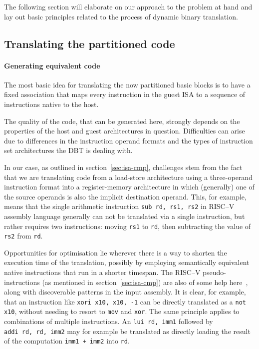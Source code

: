 The following section will elaborate on our approach to the problem at hand and lay out basic principles related to the process of dynamic binary translation.

\subsection{Translating the partitioned code}
\paragraph{Generating equivalent code} \mbox{}

The most basic idea for translating the now partitioned basic blocks is to have a fixed association that maps every instruction in the guest ISA to a sequence of instructions native to the host.

The quality of the code, that can be generated here, strongly depends on the properties of the host and guest architectures in question.
Difficulties can arise due to differences in the instruction operand formats and the types of instruction set architectures the DBT is dealing with.

In our case, as outlined in section~\ref{sec:isa-cmp}, challenges stem from the fact that we are translating code from a load-store architecture using a three-operand instruction format into a register-memory architecture in which (generally) one of the source operands is also the implicit destination operand.
This, for example, means that the single arithmetic instruction \texttt{sub~rd,~rs1,~rs2} in RISC--V assembly language generally can not be translated via a single instruction, but rather requires two instructions: moving \texttt{rs1} to \texttt{rd}, then subtracting the value of \texttt{rs2} from \texttt{rd}.

Opportunities for optimisation lie wherever there is a way to shorten the execution time of the translation, possibly by employing semantically equivalent native instructions that run in a shorter timespan.
The RISC--V pseudo-instructions (as mentioned in section~\ref{sec:isa-cmp}) are also of some help here~\cite[S. 139]{riscvspec}, along with discoverable patterns in the input assembly.
It is clear, for example, that an instruction like \texttt{xori~x10,~x10,~-1} can be directly translated as a \texttt{not x10}, without needing to resort to \texttt{mov} and \texttt{xor}.
The same principle applies to combinations of multiple instructions.
An \texttt{lui~rd,~imm1} followed by \texttt{addi~rd,~rd,~imm2} may for example be translated as directly loading the result of the computation \texttt{imm1~+~imm2} into \texttt{rd}.

